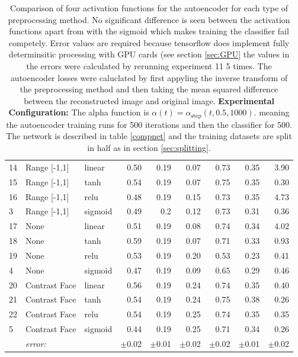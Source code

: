 \begin{table}[!h]
{\begin{tabular}{lllrrrrrr}
   14&Range [-1,1]      & linear &    0.50 &   0.19 &     0.07 &    0.73 &   0.35 &     3.90 \\
   15&Range [-1,1]      & tanh   &    0.54 &   0.19 &     0.07 &    0.75 &   0.35 &     0.30 \\
   16&Range [-1,1]      & relu   &    0.48 &   0.19 &     0.15 &    0.73 &   0.35 &     4.73 \\
   3 & Range [-1,1]      & sigmoid &    0.49 &   0.2  &     0.12 &    0.73 &   0.31 &     0.36 \\
   17&None              & linear &    0.51 &   0.19 &     0.08 &    0.74 &   0.34 &     4.02 \\
   18&None              & tanh   &    0.59 &   0.19 &     0.07 &    0.71 &   0.33 &     0.93 \\
   19&None              & relu   &    0.53 &   0.19 &     0.20 &    0.53 &   0.23 &     0.41 \\
   4 & None       & sigmoid &    0.47 &   0.19 &     0.09 &    0.65 &   0.29 &     0.46 \\
   20&Contrast Face     & linear &    0.56 &   0.19 &     0.24 &    0.74 &   0.35 &     0.40 \\
   21&Contrast Face     & tanh   &    0.54 &   0.19 &     0.24 &    0.75 &   0.38 &     0.26 \\
   22&Contrast Face     & relu   &    0.54 &   0.19 &     0.25 &    0.74 &   0.35 &     0.35 \\
   5 & Contrast Face    & sigmoid &    0.44 &   0.19 &     0.25 &    0.71 &   0.34 &     0.26 \\
    &{\it error:}  &&$\pm$0.02 &$\pm$0.01 &$\pm$0.02  &$\pm$0.02 &$\pm$0.01 &$\pm$0.02 \\
   \hline
  \end{tabular}
\caption{Comparison of four activation functions for the autoencoder for each type of preprocessing method.
No significant difference is seen between the activation functions apart from with the sigmoid
which makes training the classifier fail competely.
Error values are required because tensorflow does implement fully determinsitic
processing with GPU cards (see section \ref{sec:GPU} the values in the errors were
calculated by rerunning experiment 11 5 times. The autoencoder losses were caluclated
by first appyling the inverse transform of the preprocessing method and then taking the mean squared
difference between the reconstructed image and original image. {\bf Experimental Configuration:}
The alpha function is $\alpha(t)=\alpha_{\text{step}}(t,0.5,1000)$.
meaning the autoencoder training runs for 500 iterations and then the classifier for 500.
The network is described in table \ref{compnet} and the training datasets are split in half as in section
\ref{sec:splitting}.
} \label{tab:psearch} }
\end{table}

